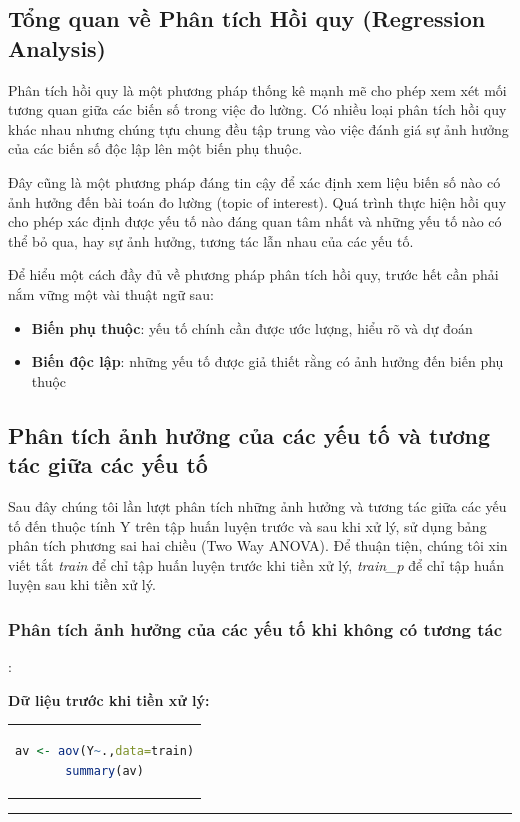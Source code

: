 \documentclass[runningheads]{llncs}
\begin{document}
\subsection{Tổng quan về Phân tích Hồi quy (Regression Analysis)}
Phân tích hồi quy là một phương pháp thống kê mạnh mẽ cho phép xem xét mối tương quan giữa các biến số trong việc đo lường. Có nhiều loại phân tích hồi quy khác nhau nhưng chúng tựu chung đều tập trung vào việc đánh giá sự ảnh hưởng của các biến số độc lập lên một biến phụ thuộc.

Đây cũng là một phương pháp đáng tin cậy để xác định xem liệu biến số nào có ảnh hưởng đến bài toán đo lường (topic of interest). Quá trình thực hiện hồi quy cho phép xác định được yếu tố nào đáng quan tâm nhất và những yếu tố nào có thể bỏ qua, hay sự ảnh hưởng, tương tác lẫn nhau của các yếu tố.

Để hiểu một cách đầy đủ về phương pháp phân tích hồi quy, trước hết cần phải nắm vững một vài thuật ngữ sau:
\begin{itemize}
	\item \textbf{Biến phụ thuộc}: yếu tố chính cần được ước lượng, hiểu rõ và dự đoán 
	\item \textbf{Biến độc lập}: những yếu tố được giả thiết rằng có ảnh hưởng đến biến phụ thuộc
\end{itemize}

\subsection{Phân tích ảnh hưởng của các yếu tố và tương tác giữa các yếu tố}
Sau đây chúng tôi lần lượt phân tích những ảnh hưởng và tương tác giữa các yếu tố đến thuộc tính Y trên tập huấn luyện trước và sau khi xử lý, sử dụng bảng phân tích phương sai hai chiều (Two Way ANOVA). Để thuận tiện, chúng tôi xin viết tắt \textit{train} để chỉ tập huấn luyện trước khi tiền xử lý, \textit{train\_p} để chỉ tập huấn luyện sau khi tiền xử lý.
\subsubsection{Phân tích ảnh hưởng của các yếu tố khi không có tương tác}:

\vspace{0.5cm}
\textbf{Dữ liệu trước khi tiền xử lý:}
\begin{center}
\begin{tabular}{c}
\begin{lstlisting}[language=R]
av <- aov(Y~.,data=train)
summary(av)
\end{lstlisting}
\end{tabular}
\end{center}
\hrule
\end{document}
